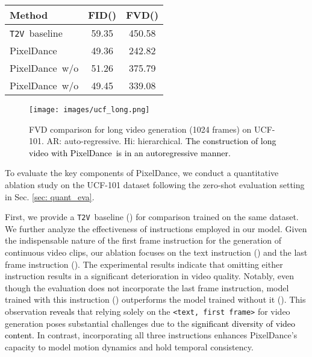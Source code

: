 \documentclass[10pt,twocolumn,letterpaper]{article}
\newcommand{\tcb}{\textcolor{black}}
\newcommand{\tv}{{\texttt{T2V}}}
\newcommand{\ours}{{PixelDance}}
\begin{document}
\begin{table}[ht]
\begin{center}
\small
{}
\begingroup

\setlength{\tabcolsep}{20pt}
\begin{NiceTabular}{@{}lcc@{}}

\toprule
Method &
FID() &
FVD() \\

\midrule
{} \tv~baseline & 59.35 & 450.58 \\
\midrule
{} \ours & 49.36 & 242.82 \\
 \ours~w/o  & 51.26 & 375.79 \\
 \ours~w/o  & 49.45 & 339.08 \\
\bottomrule

\end{NiceTabular}

\endgroup \label{table: ablation}
\end{center}
\end{table}


\begin{figure}[t]
  \centering
  \texttt{[image: images/ucf\_long.png]}
  \caption{
  FVD comparison for long video generation (1024 frames) on UCF-101. AR: auto-regressive. Hi: hierarchical. \tcb{The construction of long video with \ours~is in an autoregressive manner.}
  }
  \label{fig: ucf_long}
\end{figure}


To evaluate the key components of \ours, we conduct a quantitative ablation study on the UCF-101 dataset following the zero-shot evaluation setting in Sec. \ref{sec: quant_eva}.


First, we provide a \tv~baseline () for comparison trained on the same dataset. We further analyze the effectiveness of instructions employed in our model. Given the indispensable nature of the first frame instruction for the generation of continuous video clips, our ablation focuses on the text instruction () and the last frame instruction (). The experimental results indicate that omitting either instruction results in a significant deterioration in video quality. Notably, even though the evaluation does not incorporate the last frame instruction, model trained with this instruction () outperforms the model trained without it ().
This observation \tcb{reveals} that relying solely on the \texttt{<text, first frame>} for video generation poses substantial challenges due to the \tcb{significant diversity of video content.} In contrast, incorporating all three instructions enhances \ours’s capacity to model motion dynamics and hold temporal consistency. 
\end{document}
